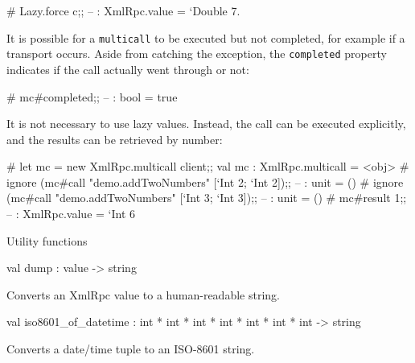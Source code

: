 \documentclass[11pt]{article}
\begin{document}
\begin{ocamldocdescription}
\begin{ocamldoccode}
        # Lazy.force c;;
        -- : XmlRpc.value = `Double 7.
    
\end{ocamldoccode}

    It is possible for a {\tt{multicall}} to be executed but not completed, for
    example if a transport occurs. Aside from catching the exception, the
    {\tt{completed}} property indicates if the call actually went through or not: \begin{ocamldoccode}

        # mc#completed;;
        -- : bool = true
    
\end{ocamldoccode}

    It is not necessary to use lazy values. Instead, the call can be
    executed explicitly, and the results can be retrieved by number: \begin{ocamldoccode}

        # let mc = new XmlRpc.multicall client;;
        val mc : XmlRpc.multicall = <obj>
        # ignore (mc#call "demo.addTwoNumbers" [`Int 2; `Int 2]);;
        -- : unit = ()
        # ignore (mc#call "demo.addTwoNumbers" [`Int 3; `Int 3]);;
        -- : unit = ()
        # mc#result 1;;
        -- : XmlRpc.value = `Int 6
    
\end{ocamldoccode}



\end{ocamldocdescription}




Utility functions



\label{val:XmlRpc.dump}\begin{ocamldoccode}
val dump : value -> string
\end{ocamldoccode}
\begin{ocamldocdescription}
Converts an XmlRpc value to a human-readable string.


\end{ocamldocdescription}




\label{val:XmlRpc.iso8601-underscoreof-underscoredatetime}\begin{ocamldoccode}
val iso8601_of_datetime : int * int * int * int * int * int * int -> string
\end{ocamldoccode}
\begin{ocamldocdescription}
Converts a date/time tuple to an ISO-8601 string.


\end{ocamldocdescription}
\end{document}
